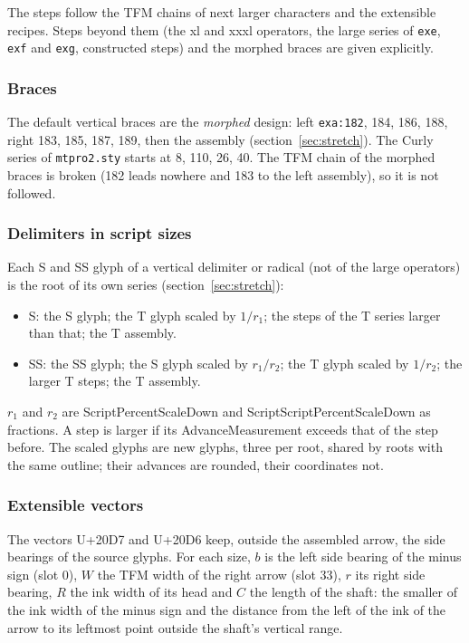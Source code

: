 \documentclass[10pt]{article}
\newcommand\file[1]{\texttt{#1}}
\newcommand\U[1]{U+#1}
\newcommand\slot[2]{\texttt{#1:#2}}
\begin{document}
The steps follow the TFM chains of next larger characters and the
extensible recipes.  Steps beyond them (the xl and xxxl operators, the
large series of \file{exe}, \file{exf} and \file{exg}, constructed
steps) and the morphed braces are given explicitly.

\subsubsection{Braces}

The default vertical braces are the \emph{morphed} design: left
\slot{exa}{182}, 184, 186, 188, right 183, 185, 187, 189, then the
assembly (section~\ref{sec:stretch}).  The Curly series of
\file{mtpro2.sty} starts at 8, 110, 26, 40.  The TFM chain of
the morphed braces is broken (182 leads nowhere and 183 to the left
assembly), so it is not followed.

\subsubsection{Delimiters in script sizes}

Each S and SS glyph of a vertical delimiter or radical (not of the
large operators) is the root of its own series
(section~\ref{sec:stretch}):
\begin{itemize}
\item S: the S glyph; the T glyph scaled by $1/r_1$; the steps of the
  T series larger than that; the T assembly.
\item SS: the SS glyph; the S glyph scaled by $r_1/r_2$; the T glyph
  scaled by $1/r_2$; the larger T steps; the T assembly.
\end{itemize}
$r_1$ and $r_2$ are ScriptPercentScaleDown and
ScriptScriptPercentScaleDown as fractions.  A step is larger if its
AdvanceMeasurement exceeds that of the step before.  The scaled glyphs
are new glyphs, three per root, shared by roots with the same outline;
their advances are rounded, their coordinates not.

\subsubsection{Extensible vectors}

The vectors \U{20D7} and \U{20D6} keep, outside the assembled arrow,
the side bearings of the source glyphs.  For each size, $b$ is the left
side bearing of the minus sign (slot 0), $W$ the TFM width of the right
arrow (slot 33), $r$ its right side bearing, $R$ the ink width of its
head and $C$ the length of the shaft: the smaller of the ink width of
the minus sign and the distance from the left of the ink of the arrow
to its leftmost point outside the shaft's vertical range.
\end{document}
